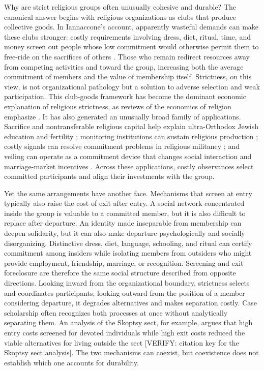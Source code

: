 \documentclass[12pt]{article}
\begin{document}
Why are strict religious groups often unusually cohesive and durable? The canonical answer begins with religious organizations as clubs that produce collective goods. In Iannaccone's account, apparently wasteful demands can make these clubs stronger: costly requirements involving dress, diet, ritual, time, and money screen out people whose low commitment would otherwise permit them to free-ride on the sacrifices of others \citep{iannaccone1988,iannaccone1992,iannaccone1994}. Those who remain redirect resources away from competing activities and toward the group, increasing both the average commitment of members and the value of membership itself. Strictness, on this view, is not organizational pathology but a solution to adverse selection and weak participation. This club-goods framework has become the dominant economic explanation of religious strictness, as reviews of the economics of religion emphasize \citep{iyer2016,carvalho2019}. It has also generated an unusually broad family of applications. Sacrifice and nontransferable religious capital help explain ultra-Orthodox Jewish education and fertility \citep{berman2000}; monitoring institutions can sustain religious production \citep{mcbride2007}; costly signals can resolve commitment problems in religious militancy \citep{bermanlaitin2008}; and veiling can operate as a commitment device that changes social interaction and marriage-market incentives \citep{carvalho2013}. Across these applications, costly observances select committed participants and align their investments with the group.

Yet the same arrangements have another face. Mechanisms that screen at entry typically also raise the cost of exit after entry. A social network concentrated inside the group is valuable to a committed member, but it is also difficult to replace after departure. An identity made inseparable from membership can deepen solidarity, but it can also make departure psychologically and socially disorganizing. Distinctive dress, diet, language, schooling, and ritual can certify commitment among insiders while isolating members from outsiders who might provide employment, friendship, marriage, or recognition. Screening and exit foreclosure are therefore the same social structure described from opposite directions. Looking inward from the organizational boundary, strictness selects and coordinates participants; looking outward from the position of a member considering departure, it degrades alternatives and makes separation costly. Case scholarship often recognizes both processes at once without analytically separating them. An analysis of the Skoptsy sect, for example, argues that high entry costs screened for devoted individuals while high exit costs reduced the viable alternatives for living outside the sect [VERIFY: citation key for the Skoptsy sect analysis]. The two mechanisms can coexist, but coexistence does not establish which one accounts for durability.
\end{document}
